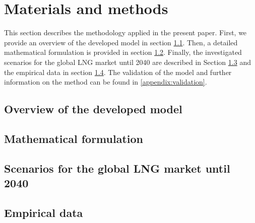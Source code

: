 \section{Materials and methods}\label{methodology}
This section describes the methodology applied in the present paper. First, we provide an overview of the developed model in section \ref{met:over}. Then, a detailed mathematical formulation is provided in section \ref{met:math}. Finally, the investigated scenarios for the global LNG market until 2040 are described in Section \ref{met:sce} and the empirical data in section \ref{met:data}. The validation of the model and further information on the method can be found in \ref{appendix:validation}.   

\subsection{Overview of the developed model}\label{met:over}
\subsection{Mathematical formulation}\label{met:math}
\subsection{Scenarios for the global LNG market until 2040}\label{met:sce}
\subsection{Empirical data}\label{met:data}



